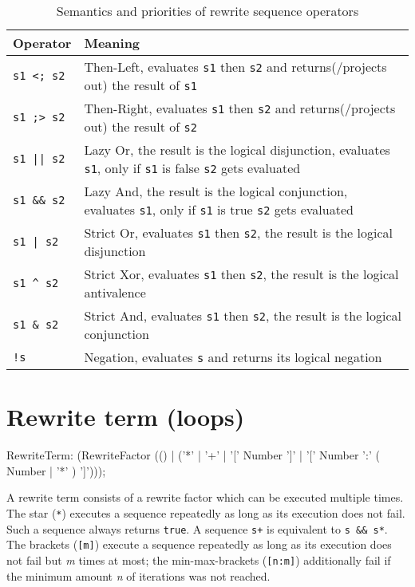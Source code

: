 \begin{table}[htbp]
    \begin{tabularx}{\linewidth}{l|X}
        \bf Operator & \bf Meaning \\\hline\hline
        \verb/s1 <; s2/ & Then-Left, evaluates \texttt{s1} then \texttt{s2} and returns(/projects out) the result of \texttt{s1}\\
		\verb/s1 ;> s2/ & Then-Right, evaluates \texttt{s1} then \texttt{s2} and returns(/projects out) the result of \texttt{s2}\\\hline
        \verb/s1 || s2/ & Lazy Or, the result is the logical disjunction, evaluates \texttt{s1}, only if \texttt{s1} is false \texttt{s2} gets evaluated\\\hline
        \verb/s1 && s2/ & Lazy And, the result is the logical conjunction, evaluates \texttt{s1}, only if \texttt{s1} is true \texttt{s2} gets evaluated\\\hline
        \verb/s1 | s2/ & Strict Or, evaluates \texttt{s1} then \texttt{s2}, the result is the logical disjunction\\\hline
        \verb/s1 ^ s2/ & Strict Xor, evaluates \texttt{s1} then \texttt{s2}, the result is the logical antivalence\\\hline
        \verb/s1 & s2/ & Strict And, evaluates \texttt{s1} then \texttt{s2}, the result is the logical conjunction\\\hline
        \verb/!s/ & Negation, evaluates \texttt{s} and returns its logical negation\\\hline
	\end{tabularx}    
    \caption{Semantics and priorities of rewrite sequence operators}
    \label{tbl:sequ:op}
\end{table}


\section{Rewrite term (loops)}

\begin{rail}
  RewriteTerm: 
    (RewriteFactor (() | ('*' | '+' | '[' Number ']' | '[' Number ':' ( Number | '*' ) ']')));
\end{rail}

A rewrite term consists of a rewrite factor which can be executed multiple times.
The star (\texttt{*}) executes a sequence repeatedly as long as its execution does not fail. 
Such a sequence always returns \texttt{true}.
A sequence \verb#s+# is equivalent to \verb#s && s*#.
The brackets (\texttt{[m]}) execute a sequence repeatedly as long as its execution does not fail but \emph{m} times at most;
the min-max-brackets (\texttt{[n:m]}) additionally fail if the minimum amount \emph{n} of iterations was not reached.


